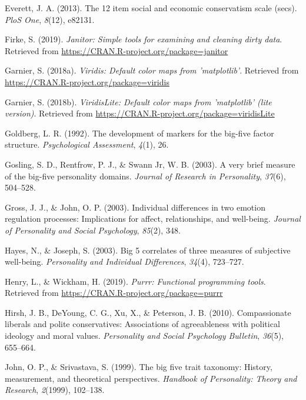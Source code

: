 \documentclass[man]{apa6}
\begin{document}
\hypertarget{ref-everett201312}{}
Everett, J. A. (2013). The 12 item social and economic conservatism
scale (secs). \emph{PloS One}, \emph{8}(12), e82131.

\hypertarget{ref-R-janitor}{}
Firke, S. (2019). \emph{Janitor: Simple tools for examining and cleaning
dirty data}. Retrieved from
\url{https://CRAN.R-project.org/package=janitor}

\hypertarget{ref-R-viridis}{}
Garnier, S. (2018a). \emph{Viridis: Default color maps from
'matplotlib'}. Retrieved from
\url{https://CRAN.R-project.org/package=viridis}

\hypertarget{ref-R-viridisLite}{}
Garnier, S. (2018b). \emph{ViridisLite: Default color maps from
'matplotlib' (lite version)}. Retrieved from
\url{https://CRAN.R-project.org/package=viridisLite}

\hypertarget{ref-goldberg1992development}{}
Goldberg, L. R. (1992). The development of markers for the big-five
factor structure. \emph{Psychological Assessment}, \emph{4}(1), 26.

\hypertarget{ref-gosling2003very}{}
Gosling, S. D., Rentfrow, P. J., \& Swann Jr, W. B. (2003). A very brief
measure of the big-five personality domains. \emph{Journal of Research
in Personality}, \emph{37}(6), 504--528.

\hypertarget{ref-gross2003individual}{}
Gross, J. J., \& John, O. P. (2003). Individual differences in two
emotion regulation processes: Implications for affect, relationships,
and well-being. \emph{Journal of Personality and Social Psychology},
\emph{85}(2), 348.

\hypertarget{ref-hayes2003big}{}
Hayes, N., \& Joseph, S. (2003). Big 5 correlates of three measures of
subjective well-being. \emph{Personality and Individual Differences},
\emph{34}(4), 723--727.

\hypertarget{ref-R-purrr}{}
Henry, L., \& Wickham, H. (2019). \emph{Purrr: Functional programming
tools}. Retrieved from \url{https://CRAN.R-project.org/package=purrr}

\hypertarget{ref-hirsh2010compassionate}{}
Hirsh, J. B., DeYoung, C. G., Xu, X., \& Peterson, J. B. (2010).
Compassionate liberals and polite conservatives: Associations of
agreeableness with political ideology and moral values.
\emph{Personality and Social Psychology Bulletin}, \emph{36}(5),
655--664.

\hypertarget{ref-john1999big}{}
John, O. P., \& Srivastava, S. (1999). The big five trait taxonomy:
History, measurement, and theoretical perspectives. \emph{Handbook of
Personality: Theory and Research}, \emph{2}(1999), 102--138.
\end{document}
